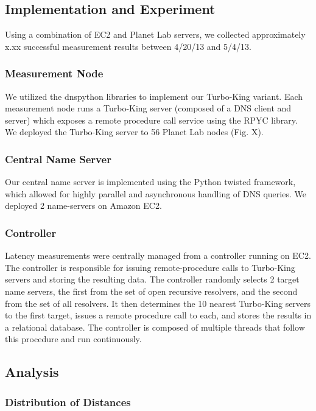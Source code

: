 \subsection{Implementation and Experiment}
\label{sec:impl-exper}

Using a combination of EC2 and Planet Lab servers, we collected approximately x.xx successful measurement results between 4/20/13 and 5/4/13.

\subsubsection{Measurement Node}
We utilized the dnspython libraries to implement our Turbo-King variant. Each measurement node runs a Turbo-King server (composed of a DNS client and server) which exposes a remote procedure call service using the RPYC library. We deployed the Turbo-King server to 56 Planet Lab nodes (Fig. X).

\subsubsection{Central Name Server}
Our central name server is implemented using the Python twisted framework, which allowed for highly parallel and asynchronous handling of DNS queries. We deployed 2 name-servers on Amazon EC2.

\subsubsection{Controller}
Latency measurements were centrally managed from a controller running on EC2. The controller is responsible for issuing remote-procedure calls to Turbo-King servers and storing the resulting data. The controller randomly selects 2 target name servers, the first from the set of open recursive resolvers, and the second from the set of all resolvers. It then determines the 10 nearest Turbo-King servers to the first target, issues a remote procedure call to each, and stores the results in a relational database. The controller is composed of multiple threads that follow this procedure and run continuously.

\subsection{Analysis}
\label{sec:analysis}

\subsubsection{Distribution of Distances}

